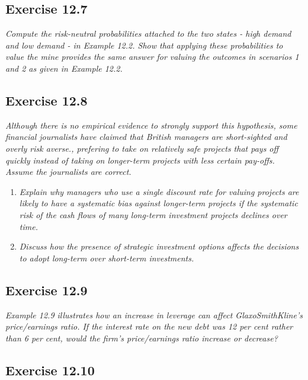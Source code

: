 \documentclass[]{book}
\theoremstyle{definition}
\theoremstyle{definition}
\theoremstyle{remark}
\begin{document}
\subsection{Exercise 12.7}\label{exercise-12.7}

\emph{Compute the risk-neutral probabilities attached to the two states
- high demand and low demand - in Example 12.2. Show that applying these
probabilities to value the mine provides the same answer for valuing the
outcomes in scenarios 1 and 2 as given in Example 12.2.}
\citep[p.426]{book}

\subsection{Exercise 12.8}\label{exercise-12.8}

\emph{Although there is no empirical evidence to strongly support this
hypothesis, some financial journalists have claimed that British
managers are short-sighted and overly risk averse., prefering to take on
relatively safe projects that pays off quickly instead of taking on
longer-term projects with less certain pay-offs. Assume the journalists
are correct.} \citep[p.426]{book}

\begin{enumerate}
\def\labelenumi{\alph{enumi}.}
\item
  \emph{Explain why managers who use a single discount rate for valuing
  projects are likely to have a systematic bias against longer-term
  projects if the systematic risk of the cash flows of many long-term
  investment projects declines over time.} \citep[p.426]{book}
\item
  \emph{Discuss how the presence of strategic investment options affects
  the decisions to adopt long-term over short-term investments.}
  \citep[p.426]{book}
\end{enumerate}

\subsection{Exercise 12.9}\label{exercise-12.9}

\emph{Example 12.9 illustrates how an increase in leverage can affect
GlaxoSmithKline's price/earnings ratio. If the interest rate on the new
debt was 12 per cent rather than 6 per cent, would the firm's
price/earnings ratio increase or decrease?} \citep[p.426]{book}

\subsection{Exercise 12.10}\label{exercise-12.10}
\end{document}
